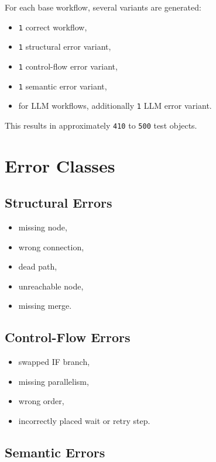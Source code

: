 \documentclass[12pt,a4paper]{article}
\begin{document}
For each base workflow, several variants are generated:

\begin{itemize}
  \item \texttt{1} correct workflow,
  \item \texttt{1} structural error variant,
  \item \texttt{1} control-flow error variant,
  \item \texttt{1} semantic error variant,
  \item for LLM workflows, additionally \texttt{1} LLM error variant.
\end{itemize}

This results in approximately \texttt{410} to \texttt{500} test objects.

\section{Error Classes}

\subsection{Structural Errors}

\begin{itemize}
  \item missing node,
  \item wrong connection,
  \item dead path,
  \item unreachable node,
  \item missing merge.
\end{itemize}

\subsection{Control-Flow Errors}

\begin{itemize}
  \item swapped IF branch,
  \item missing parallelism,
  \item wrong order,
  \item incorrectly placed wait or retry step.
\end{itemize}

\subsection{Semantic Errors}
\end{document}
